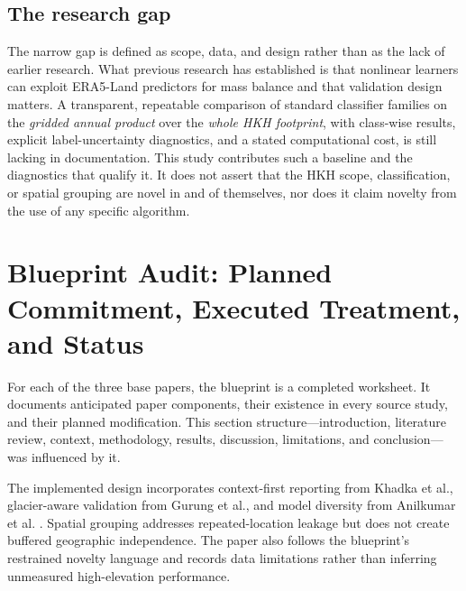 \documentclass[conference]{IEEEtran}
\begin{document}
\subsection{The research gap}
The narrow gap is defined as scope, data, and design rather than as the lack of earlier research. What previous research has established is that nonlinear learners can exploit ERA5-Land predictors for mass balance and that validation design matters. A transparent, repeatable comparison of standard classifier families on the \emph{gridded annual product} over the \emph{whole HKH footprint}, with class-wise results, explicit label-uncertainty diagnostics, and a stated computational cost, is still lacking in documentation. This study contributes such a baseline and the diagnostics that qualify it. It does not assert that the HKH scope, classification, or spatial grouping are novel in and of themselves, nor does it claim novelty from the use of any specific algorithm.

\section{Blueprint Audit: Planned Commitment, Executed Treatment, and Status}\label{sec:blueprint}
For each of the three base papers, the blueprint is a completed worksheet. It documents anticipated paper components, their existence in every source study, and their planned modification. This section structure—introduction, literature review, context, methodology, results, discussion, limitations, and conclusion—was influenced by it.

The implemented design incorporates context-first reporting from Khadka et al., glacier-aware validation from Gurung et al., and model diversity from Anilkumar et al. \cite{anilkumar2023,gurung2025,khadka2023}. Spatial grouping addresses repeated-location leakage but does not create buffered geographic independence. The paper also follows the blueprint's restrained novelty language and records data limitations rather than inferring unmeasured high-elevation performance.
\end{document}
